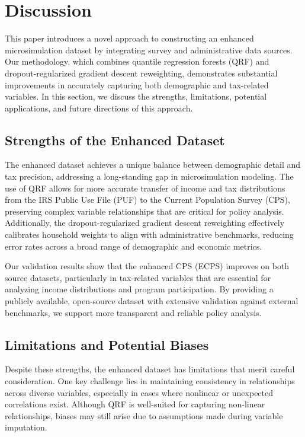 \section{Discussion}

This paper introduces a novel approach to constructing an enhanced microsimulation dataset by integrating survey and administrative data sources. Our methodology, which combines quantile regression forests (QRF) and dropout-regularized gradient descent reweighting, demonstrates substantial improvements in accurately capturing both demographic and tax-related variables. In this section, we discuss the strengths, limitations, potential applications, and future directions of this approach.

\subsection{Strengths of the Enhanced Dataset}

The enhanced dataset achieves a unique balance between demographic detail and tax precision, addressing a long-standing gap in microsimulation modeling. The use of QRF allows for more accurate transfer of income and tax distributions from the IRS Public Use File (PUF) to the Current Population Survey (CPS), preserving complex variable relationships that are critical for policy analysis. Additionally, the dropout-regularized gradient descent reweighting effectively calibrates household weights to align with administrative benchmarks, reducing error rates across a broad range of demographic and economic metrics.

Our validation results show that the enhanced CPS (ECPS) improves on both source datasets, particularly in tax-related variables that are essential for analyzing income distributions and program participation. By providing a publicly available, open-source dataset with extensive validation against external benchmarks, we support more transparent and reliable policy analysis.

\subsection{Limitations and Potential Biases}

Despite these strengths, the enhanced dataset has limitations that merit careful consideration. One key challenge lies in maintaining consistency in relationships across diverse variables, especially in cases where nonlinear or unexpected correlations exist. Although QRF is well-suited for capturing non-linear relationships, biases may still arise due to assumptions made during variable imputation.

